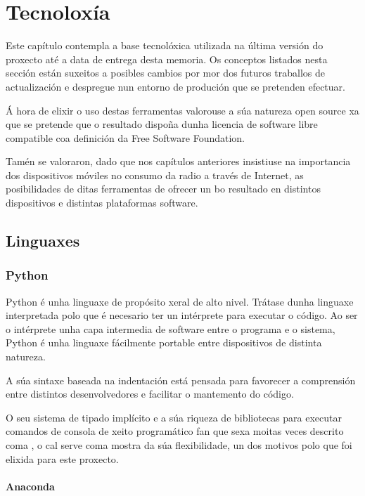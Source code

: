 \chapter[Tecnoloxías Utilizadas]{
  \label{chp:tecnologia}
  Tecnoloxía
}
\minitoc
\newpage

Este capítulo contempla a base tecnolóxica utilizada na última versión do proxecto até a data
de entrega desta memoria. Os conceptos listados nesta sección están suxeitos a posibles cambios
por mor dos futuros traballos de actualización e despregue nun entorno de produción que se pretenden
efectuar. 

Á hora de elixir o uso destas ferramentas valorouse a súa natureza open source xa que se pretende que o
resultado dispoña dunha licencia de software libre compatible coa definición da Free Software
Foundation. 

Tamén se valoraron, dado que nos capítulos anteriores insistiuse na importancia dos dispositivos móviles
no consumo da radio a través de Internet, as posibilidades de ditas ferramentas de ofrecer un bo resultado
en distintos dispositivos e distintas plataformas software. 


\section{Linguaxes}

\subsection{Python}
\label{python}
Python é unha linguaxe de propósito xeral de alto nivel. Trátase dunha linguaxe interpretada polo que é necesario 
ter un intérprete para executar o código. Ao ser o intérprete unha capa intermedia de software entre o programa
e o sistema, Python é unha linguaxe fácilmente portable entre dispositivos de distinta natureza.

A súa sintaxe baseada na indentación está pensada para favorecer a comprensión entre distintos desenvolvedores e 
facilitar o mantemento do código. 

O seu sistema de tipado implícito e a súa riqueza de bibliotecas para executar comandos de consola de xeito programático
fan que sexa moitas veces descrito coma \cite{python1}, o cal serve coma 
mostra da súa flexibilidade, un dos motivos polo que foi elixida para este proxecto.

\subsubsection{Anaconda}


